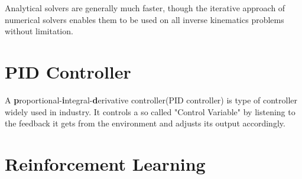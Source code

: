 Analytical solvers are generally much faster, though the iterative approach of numerical solvers enables them to be used on all inverse kinematics problems without limitation.





\section{PID Controller}
A \textbf{p}roportional-\textbf{i}ntegral-\textbf{d}erivative controller(PID controller) is type of controller widely used in industry.
It controls a so called "Control Variable" by listening to the feedback it gets from the environment and adjusts its output accordingly.
 


\section{Reinforcement Learning}
